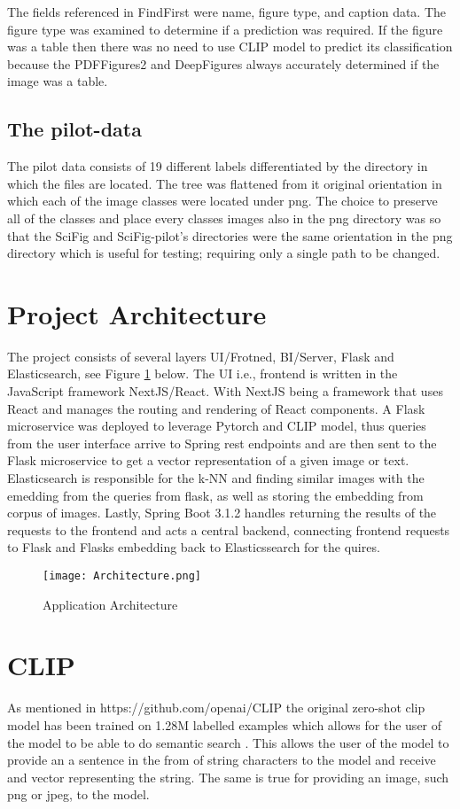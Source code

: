 \documentclass[letterpaper, 10 pt, conference]{ieeeconf}  %
\begin{document}
The fields referenced in FindFirst were name, figure type, and caption data. The figure type was examined 
to determine if a prediction was required. If the figure was a table then there was no need to use CLIP model
to predict its classification because the PDFFigures2 and DeepFigures always accurately determined if the image was a table. 

\subsection{The pilot-data}
The pilot data consists of 19 different labels differentiated by the directory in which the files are located.
The tree was flattened from it original orientation in which each of the image classes were located under png.
The choice to preserve all of the classes and place every classes images also in the png directory was so that 
the SciFig and SciFig-pilot's directories were the same orientation in the png directory which is useful for 
testing; requiring only a single path to be changed. 

\section{Project Architecture}
The project consists of several layers UI/Frotned, BI/Server, Flask and Elasticsearch, see Figure 
\ref{fig:architecture} below. The UI i.e., frontend is written in the JavaScript framework NextJS/React.
With NextJS being a framework that uses React and manages the routing and rendering of React components. 
A Flask microservice was deployed to leverage Pytorch and CLIP model,
thus queries from the user interface arrive to Spring rest endpoints and are then sent to the Flask
microservice to get a vector representation of a given image or text.
Elasticsearch is responsible for the k-NN and finding similar images with the emedding from the queries from 
flask, as well as storing the embedding from corpus of images. 
Lastly, Spring Boot 3.1.2 handles returning the results of the 
requests to the frontend and acts a central backend, connecting frontend requests to Flask and Flasks embedding back to Elasticssearch for the quires. 

\begin{figure}[h]
\texttt{[image: Architecture.png]}
\caption{Application Architecture}
\label{fig:architecture}
\end{figure}



\section{CLIP}
As mentioned in https://github.com/openai/CLIP the original zero-shot clip model has been
trained on 1.28M labelled examples which allows for the user of the model to be able to do
semantic search \cite{OpenAI}. This allows the user of the model to provide an a sentence in 
the from of string characters to the model and receive and vector representing the string. The 
same is true for providing an image, such png or jpeg, to the model. 
\end{document}

